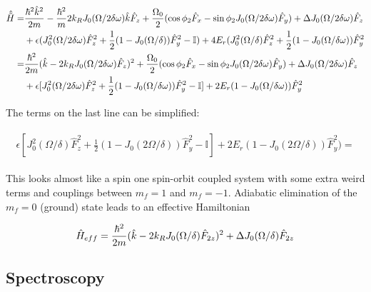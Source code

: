 \begin{align}
\begin{split}
\hat{\tilde{H}} = &\frac{\hbar^2\hat{k}^2}{2m} - \frac{\hbar^2}{m}2{{k_R}} J_0(\Omega/2\delta\omega)\hat{k}\hat{F}_z + \frac{\Omega_0}{2}(\cos\phi_2\hat{F}_x - \sin\phi_2J_0(\Omega/2\delta\omega)\hat{F}_y)+ \Delta J_0(\Omega/2\delta\omega)\hat{F}_z \\
&+\epsilon(J_0^2(\Omega/2\delta\omega)\hat{F}_z^2 + \frac{1}{2}(1-J_0(\Omega/\delta))\hat{F}_y^2-\mathbb{I})+4E_r(J_0^2(\Omega/\delta)\hat{F}_z^2 + \frac{1}{2}(1-J_0(\Omega/\delta\omega))\hat{F}_y^2\\
= & \frac{\hbar^2}{2m}(\hat{k}-2{{k_R}} J_0(\Omega/2\delta\omega)\hat{F}_z)^2 +\frac{\Omega_0}{2}(\cos\phi_2\hat{F}_x - \sin\phi_2J_0(\Omega/2\delta\omega)\hat{F}_y) + \Delta J_0(\Omega/2\delta\omega)\hat{F}_z \\
& + \epsilon[J_0^2(\Omega/2\delta\omega)\hat{F}_z^2 + \frac{1}{2}(1-J_0(\Omega/\delta\omega))\hat{F}_y^2-\mathbb{I}]+2E_r (1-J_0(\Omega/\delta\omega))\hat{F}_y^2
\end{split}
\end{align}


The terms on the last line can be simplified:

\begin{align}
\begin{split}
\epsilon[J_0^2(\Omega/\delta)\hat{F}_z^2 + \frac{1}{2}(1-J_0(2\Omega/\delta))\hat{F}_y^2-\mathbb{I}]+2E_r (1-J_0(2\Omega/\delta))\hat{F}_y^2) = 
\end{split}
\end{align}


This looks almost like a spin one spin-orbit coupled system with some extra weird terms and couplings between $m_f=1$ and $m_f= -1$. Adiabatic elimination of the $m_f=0$ (ground) state leads to an effective Hamiltonian

\begin{align}
\hat{H}_{eff} = \frac{\hbar^2}{2m}(\hat{k} - 2{{k_R}}     J_0(\Omega/\delta)\hat{F}_{2z})^2 + \Delta J_0(\Omega/\delta)\hat{F}_{2z}
\end{align}





\subsection{Spectroscopy}

